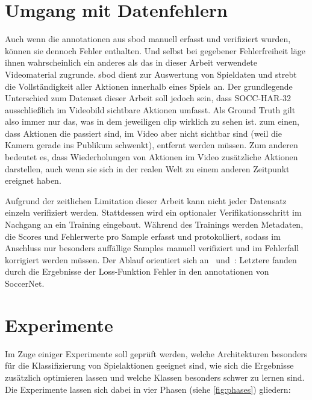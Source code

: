 \section{Umgang mit Datenfehlern}
\label{sec:umgang-mit-fehlern-in-datenset}

Auch wenn die \gls{annotationen} aus \gls{sbod} manuell erfasst und verifiziert wurden, können sie dennoch Fehler enthalten.
Und selbst bei gegebener Fehlerfreiheit läge ihnen wahrscheinlich ein anderes als das in dieser Arbeit verwendete Videomaterial zugrunde.
\gls{sbod} dient zur Auswertung von Spieldaten und strebt die Vollständigkeit aller Aktionen innerhalb eines Spiels an.
Der grundlegende Unterschied zum Datenset dieser Arbeit soll jedoch sein, dass SOCC-HAR-32 ausschließlich im Videobild sichtbare Aktionen umfasst.
Als Ground Truth gilt also immer nur das, was in dem jeweiligen \gls{clip} wirklich zu sehen ist.
\Dh zum einen, dass Aktionen die passiert sind, im Video aber nicht sichtbar sind (\zB weil die Kamera gerade ins Publikum schwenkt), entfernt werden müssen.
Zum anderen bedeutet es, dass Wiederholungen von Aktionen im Video zusätzliche Aktionen darstellen, auch wenn sie sich in der realen Welt zu einem anderen Zeitpunkt ereignet haben.

Aufgrund der zeitlichen Limitation dieser Arbeit kann nicht jeder Datensatz einzeln verifiziert werden.
Stattdessen wird ein optionaler Verifikationsschritt im Nachgang an ein Training eingebaut.
Während des Trainings werden Metadaten, die Scores und Fehlerwerte pro Sample erfasst und protokolliert, sodass im Anschluss nur besonders auffällige Samples manuell verifiziert und im Fehlerfall korrigiert werden müssen.
Der Ablauf orientiert sich an~\cite{Gugger20} und~\cite{Cioppa20}:
Letztere fanden durch die Ergebnisse der Loss-Funktion Fehler in den \gls{annotationen} von SoccerNet.

\section{Experimente}
\label{sec:experimente}

Im Zuge einiger Experimente soll geprüft werden, welche Architekturen besonders für die Klassifizierung von Spielaktionen geeignet sind, wie sich die Ergebnisse zusätzlich optimieren lassen und welche Klassen besonders schwer zu lernen sind.
Die Experimente lassen sich dabei in vier Phasen (siehe \autoref{fig:phases}) gliedern:


